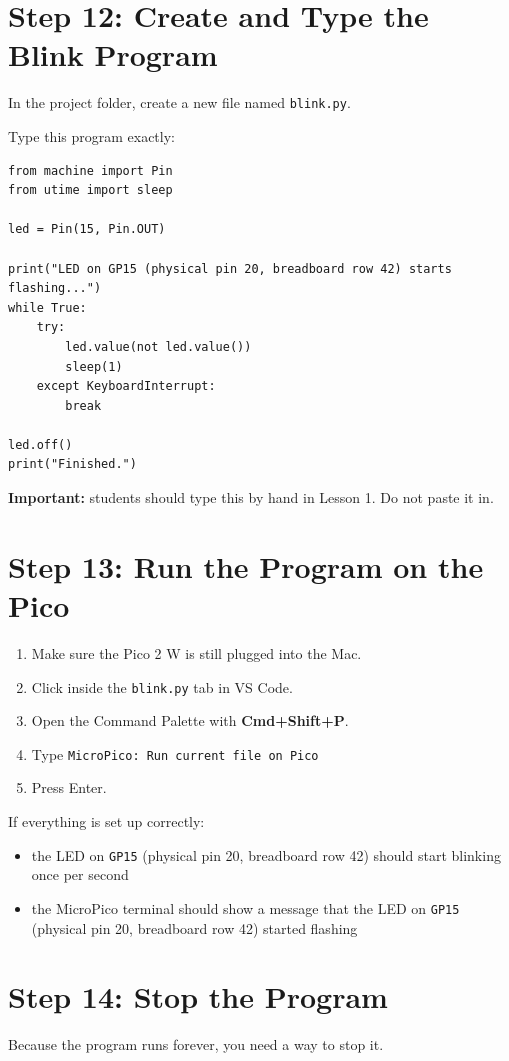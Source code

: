 \documentclass[11pt,letterpaper]{article}
\begin{document}
\section*{Step 12: Create and Type the Blink Program}
In the project folder, create a new file named \texttt{blink.py}.

Type this program exactly:

\begin{verbatim}
from machine import Pin
from utime import sleep

led = Pin(15, Pin.OUT)

print("LED on GP15 (physical pin 20, breadboard row 42) starts flashing...")
while True:
    try:
        led.value(not led.value())
        sleep(1)
    except KeyboardInterrupt:
        break

led.off()
print("Finished.")
\end{verbatim}

\textbf{Important:} students should type this by hand in Lesson 1. Do not paste it in.

\section*{Step 13: Run the Program on the Pico}
\begin{enumerate}
    \item Make sure the Pico 2 W is still plugged into the Mac.
    \item Click inside the \texttt{blink.py} tab in VS Code.
    \item Open the Command Palette with \textbf{Cmd+Shift+P}.
    \item Type \texttt{MicroPico: Run current file on Pico}
    \item Press Enter.
\end{enumerate}

If everything is set up correctly:
\begin{itemize}
    \item the LED on \texttt{GP15} (physical pin 20, breadboard row 42) should start blinking once per second
    \item the MicroPico terminal should show a message that the LED on \texttt{GP15} (physical pin 20, breadboard row 42) started flashing
\end{itemize}

\section*{Step 14: Stop the Program}
Because the program runs forever, you need a way to stop it.
\end{document}
